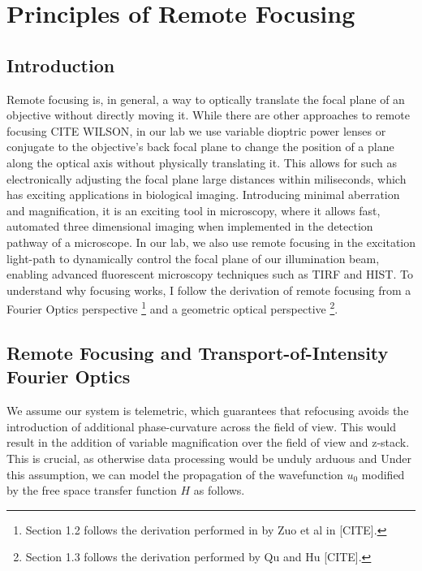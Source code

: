 \maketitle
\newpage
\section{Principles of Remote Focusing}
\subsection{Introduction}
Remote focusing is, in general, a way to optically translate the focal plane of an objective without directly moving it. While there are other approaches to remote focusing {CITE WILSON}, in our lab we use variable dioptric power lenses or conjugate to the objective's back focal plane to change the position of a plane along the optical axis without physically translating it. This allows for such as electronically adjusting the focal plane large distances within miliseconds, which has exciting applications in biological imaging. Introducing minimal aberration and magnification, it is an exciting tool in microscopy, where it allows fast, automated three dimensional imaging when implemented in the detection pathway of a microscope. In our lab, we also use remote focusing in the excitation light-path to dynamically control the focal plane of our illumination beam, enabling advanced fluorescent microscopy techniques such as TIRF and HIST. To understand why focusing works, I follow the derivation of remote focusing from a Fourier Optics perspective \footnote{Section 1.2 follows the derivation performed in by Zuo et al in [CITE].} and a geometric optical perspective \footnote{Section 1.3 follows the derivation performed by Qu and Hu [CITE].}. 
\subsection{Remote Focusing and Transport-of-Intensity Fourier Optics}
We assume our system is telemetric, which guarantees that refocusing avoids the introduction of additional phase-curvature across the field of view. This would result in the addition of variable magnification over the field of view and z-stack. This is crucial, as otherwise data processing would be unduly arduous and Under this assumption, we can model the propagation of the wavefunction $u_0$ modified by the free space transfer function $H$ as follows. 

